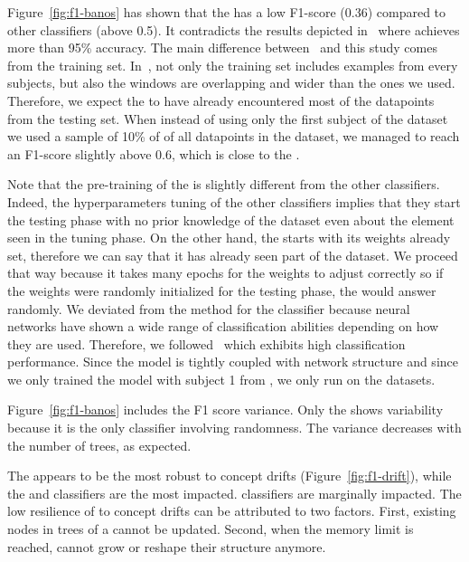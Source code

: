 Figure~\ref{fig:f1-banos} has shown that the \FNN has a low F1-score (0.36)
compared to other classifiers (above 0.5). It contradicts the results depicted
in~\cite{omid_2019} where \FNN achieves more than 95\% accuracy. The main
difference between~\cite{omid_2019} and this study comes from the training set.
In~\cite{omid_2019}, not only the training set includes examples from every
subjects, but also the windows are overlapping and wider than the ones we used.
Therefore, we expect the \FNN to have already encountered most of the datapoints
from the testing set. When instead of using only the first subject of the
\banosdataset dataset we used a sample of 10\% of of all datapoints in the
\banosdataset dataset, we managed to reach an F1-score slightly above 0.6, which
is close to the \naivebayes.

Note that the pre-training of the \FNN is slightly different from the other
classifiers. Indeed, the hyperparameters tuning of the other classifiers implies
that they start the testing phase with no prior knowledge of the dataset even
about the element seen in the tuning phase. On the other hand, the \FNN starts
with its weights already set, therefore we can say that it has already seen part
of the dataset. We proceed that way because it takes many epochs for the weights
to adjust correctly so if the weights were randomly initialized for the testing
phase, the \FNN would answer randomly.  We deviated from the method for the \FNN
classifier because neural networks have shown a wide range of classification
abilities depending on how they are used.  Therefore, we
followed~\cite{omid_2019} which exhibits high classification performance. Since
the \FNN model is tightly coupled with network structure and since we only
trained the model with subject 1 from \banosdataset, we only run \FNN on the
\banosdataset datasets.

Figure~\ref{fig:f1-banos} includes the F1 score variance. Only the
\mondrianforest shows variability because it is the only classifier involving
randomness. The variance decreases with the number of trees, as expected.

The \hoeffdingtree appears to be the most robust to concept drifts
(Figure~\ref{fig:f1-drift}), while the \mondrianforest and \naivebayes
classifiers are the most impacted. \mcnn classifiers are marginally impacted.
The low resilience of \mondrianforest to concept drifts can be attributed to
two factors. First, existing nodes in trees of a \mondrianforest cannot be updated.
Second, when the memory limit is reached, \mondrianforest cannot grow
or reshape their structure anymore.

